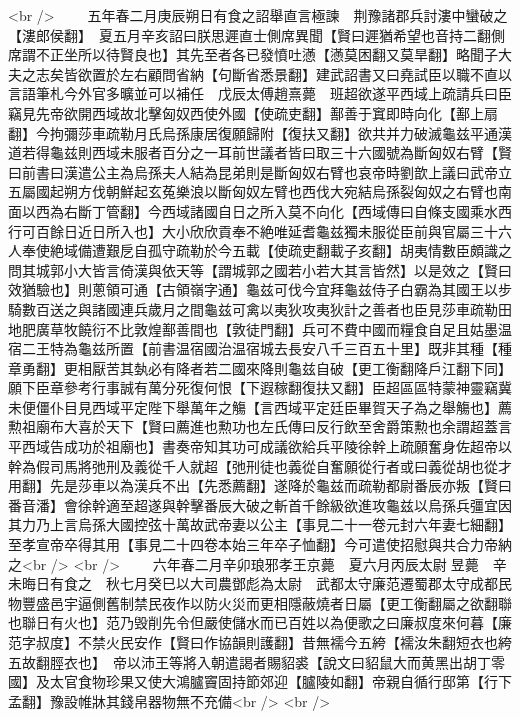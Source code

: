 <br />
　　五年春二月庚辰朔日有食之詔舉直言極諫　荆豫諸郡兵討漊中蠻破之【漊郎侯翻】　夏五月辛亥詔曰朕思遲直士側席異聞【賢曰遲猶希望也音持二翻側席謂不正坐所以待賢良也】其先至者各已發憤吐懣【懣莫困翻又莫旱翻】略聞子大夫之志矣皆欲置於左右顧問省納【句斷省悉景翻】建武詔書又曰堯試臣以職不直以言語筆札今外官多曠並可以補任　戊辰太傅趙熹薨　班超欲遂平西域上疏請兵曰臣竊見先帝欲開西域故北擊匈奴西使外國【使疏吏翻】鄯善于窴即時向化【鄯上扇翻】今拘彌莎車疏勒月氏烏孫康居復願歸附【復扶又翻】欲共并力破滅龜兹平通漢道若得龜兹則西域未服者百分之一耳前世議者皆曰取三十六國號為斷匈奴右臂【賢曰前書曰漢遣公主為烏孫夫人結為昆弟則是斷匈奴右臂也哀帝時劉歆上議曰武帝立五屬國起朔方伐朝鮮起玄菟樂浪以斷匈奴左臂也西伐大宛結烏孫裂匈奴之右臂也南面以西為右斷丁管翻】今西域諸國自日之所入莫不向化【西域傳曰自條支國乘水西行可百餘日近日所入也】大小欣欣貢奉不絶唯延耆龜兹獨未服從臣前與官屬三十六人奉使絶域備遭艱戹自孤守疏勒於今五載【使疏吏翻載子亥翻】胡夷情數臣頗識之問其城郭小大皆言倚漢與依天等【謂城郭之國若小若大其言皆然】以是效之【賢曰效猶驗也】則蔥領可通【古領嶺字通】龜兹可伐今宜拜龜兹侍子白霸為其國王以步騎數百送之與諸國連兵歲月之間龜兹可禽以夷狄攻夷狄計之善者也臣見莎車疏勒田地肥廣草牧饒衍不比敦煌鄯善間也【敦徒門翻】兵可不費中國而糧食自足且姑墨温宿二王特為龜兹所置【前書温宿國治温宿城去長安八千三百五十里】既非其種【種章勇翻】更相厭苦其埶必有降者若二國來降則龜兹自破【更工衡翻降戶江翻下同】願下臣章參考行事誠有萬分死復何恨【下遐稼翻復扶又翻】臣超區區特蒙神靈竊冀未便僵仆目見西域平定陛下舉萬年之觴【言西域平定廷臣畢賀天子為之舉觴也】薦勲祖廟布大喜於天下【賢曰薦進也勲功也左氏傳曰反行飲至舍爵策勲也余謂超蓋言平西域告成功於祖廟也】書奏帝知其功可成議欲給兵平陵徐幹上疏願奮身佐超帝以幹為假司馬將弛刑及義從千人就超【弛刑徒也義從自奮願從行者或曰義從胡也從才用翻】先是莎車以為漢兵不出【先悉薦翻】遂降於龜兹而疏勒都尉番辰亦叛【賢曰番音潘】會徐幹適至超遂與幹擊番辰大破之斬首千餘級欲進攻龜兹以烏孫兵彊宜因其力乃上言烏孫大國控弦十萬故武帝妻以公主【事見二十一卷元封六年妻七細翻】至孝宣帝卒得其用【事見二十四卷本始三年卒子恤翻】今可遣使招慰與共合力帝納之<br />
<br />
　　六年春二月辛卯琅邪孝王京薨　夏六月丙辰太尉昱薨　辛未晦日有食之　秋七月癸巳以大司農鄧彪為太尉　武都太守廉范遷蜀郡太守成都民物豐盛邑宇逼側舊制禁民夜作以防火災而更相隱蔽燒者日屬【更工衡翻屬之欲翻聯也聯日有火也】范乃毁削先令但嚴使儲水而已百姓以為便歌之曰廉叔度來何暮【廉范字叔度】不禁火民安作【賢曰作協韻則護翻】昔無襦今五絝【襦汝朱翻短衣也絝五故翻脛衣也】　帝以沛王等將入朝遣謁者賜貂裘【說文曰貂鼠大而黄黑出胡丁零國】及太官食物珍果又使大鴻臚竇固持節郊迎【臚陵如翻】帝親自循行邸第【行下孟翻】豫設帷牀其錢帛器物無不充備<br />
<br />
